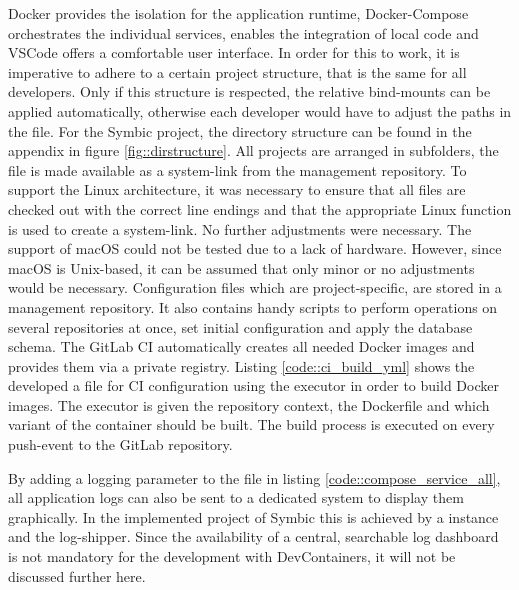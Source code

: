         Docker provides the isolation for the application runtime, Docker-Compose orchestrates the individual services, enables the integration of local code and \ac{VSCode} offers a comfortable user interface. In order for this to work, it is imperative to adhere to a certain project structure, that is the same for all developers. Only if this structure is respected, the relative bind-mounts can be applied automatically, otherwise each developer would have to adjust the paths in the  file. For the Symbic project, the directory structure can be found in the appendix in figure \ref{fig::dirstructure}. All projects are arranged in subfolders, the  file is made available as a system-link from the management repository. To support the Linux architecture, it was necessary to ensure that all files are checked out with the correct line endings and that the appropriate Linux function is used to create a system-link. No further adjustments were necessary. The support of macOS could not be tested due to a lack of hardware. However, since macOS is Unix-based, it can be assumed that only minor or no adjustments would be necessary.\newline
        Configuration files which are project-specific, are stored in a management repository. It also contains handy scripts to perform operations on several repositories at once, set initial configuration and apply the database schema. The GitLab \ac{CI} automatically creates all needed Docker images and provides them via a private registry. Listing \ref{code::ci_build_yml} shows the developed a  file for \ac{CI} configuration using the  executor in order to build Docker images. The executor is given the repository context, the Dockerfile and which variant of the container should be built. The build process is executed on every push-event to the GitLab repository.\newpage
        
        By adding a logging parameter to the  file in listing \ref{code::compose_service_all}, all application logs can also be sent to a dedicated system to display them graphically. In the implemented project of Symbic this is achieved by a  instance and the  log-shipper. Since the availability of a central, searchable log dashboard is not mandatory for the development with DevContainers, it will not be discussed further here.

